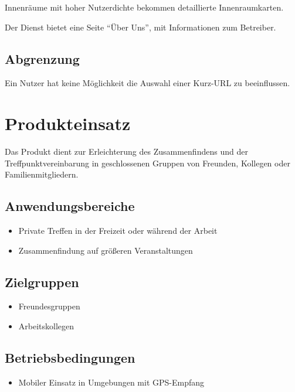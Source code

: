 \documentclass[parskip=full,11pt]{scrartcl}
\begin{document}
Innenräume mit hoher Nutzerdichte bekommen detaillierte Innenraumkarten.

Der Dienst bietet eine Seite \enquote{Über Uns},
mit Informationen zum Betreiber.

\subsection{Abgrenzung}
Ein Nutzer hat keine Möglichkeit die Auswahl einer Kurz-URL zu beeinflussen.

\pagebreak
\section{Produkteinsatz}
Das Produkt dient zur Erleichterung des Zusammenfindens und der
Treffpunktvereinbarung in geschlossenen Gruppen von Freunden, Kollegen oder
Familienmitgliedern.

\subsection{Anwendungsbereiche}
\begin{itemize}
    \item Private Treffen in der Freizeit oder während der Arbeit
    \item Zusammenfindung auf größeren Veranstaltungen
\end{itemize}

\subsection{Zielgruppen}
\begin{itemize}
    \item Freundesgruppen
    \item Arbeitskollegen
\end{itemize}

\subsection{Betriebsbedingungen}
\begin{itemize}
    \item Mobiler Einsatz in Umgebungen mit GPS-Empfang
\end{itemize}
\end{document}
